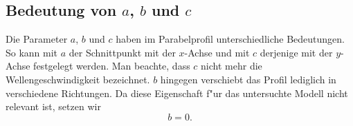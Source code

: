 \subsection{Bedeutung von \texorpdfstring{$a$}{a}, \texorpdfstring{$b$}{b} und 
\texorpdfstring{$c$}{c}}

Die Parameter $a$, $b$ und $c$ haben im Parabelprofil unterschiedliche 
Bedeutungen. So kann mit $a$ der Schnittpunkt mit der $x$-Achse 
und mit $c$ derjenige mit der $y$-Achse festgelegt werden. Man beachte, dass 
$c$ nicht mehr die Wellengeschwindigkeit bezeichnet. $b$ hingegen 
verschiebt das Profil lediglich in verschiedene Richtungen. Da diese 
Eigenschaft f"ur das untersuchte Modell nicht relevant ist, setzen wir
\begin{equation*}
	b = 0.
\end{equation*}